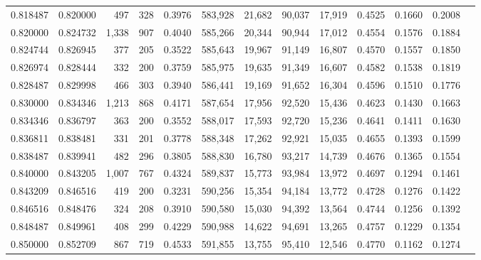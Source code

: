 \begin{tabular}{rrrrrrrrrrrrr}
0.818487 & 0.820000 &   497 & 328 &                                     0.3976 & 583,928 &  21,682 &  90,037 &  17,919 & 0.4525 & 0.1660 & 0.2008 \\
0.820000 & 0.824732 & 1,338 & 907 &                                     0.4040 & 585,266 &  20,344 &  90,944 &  17,012 & 0.4554 & 0.1576 & 0.1884 \\
0.824744 & 0.826945 &   377 & 205 &                                     0.3522 & 585,643 &  19,967 &  91,149 &  16,807 & 0.4570 & 0.1557 & 0.1850 \\
0.826974 & 0.828444 &   332 & 200 &                                     0.3759 & 585,975 &  19,635 &  91,349 &  16,607 & 0.4582 & 0.1538 & 0.1819 \\
0.828487 & 0.829998 &   466 & 303 &                                     0.3940 & 586,441 &  19,169 &  91,652 &  16,304 & 0.4596 & 0.1510 & 0.1776 \\
0.830000 & 0.834346 & 1,213 & 868 &                                     0.4171 & 587,654 &  17,956 &  92,520 &  15,436 & 0.4623 & 0.1430 & 0.1663 \\
0.834346 & 0.836797 &   363 & 200 &                                     0.3552 & 588,017 &  17,593 &  92,720 &  15,236 & 0.4641 & 0.1411 & 0.1630 \\
0.836811 & 0.838481 &   331 & 201 &                                     0.3778 & 588,348 &  17,262 &  92,921 &  15,035 & 0.4655 & 0.1393 & 0.1599 \\
0.838487 & 0.839941 &   482 & 296 &                                     0.3805 & 588,830 &  16,780 &  93,217 &  14,739 & 0.4676 & 0.1365 & 0.1554 \\
0.840000 & 0.843205 & 1,007 & 767 &                                     0.4324 & 589,837 &  15,773 &  93,984 &  13,972 & 0.4697 & 0.1294 & 0.1461 \\
0.843209 & 0.846516 &   419 & 200 &                                     0.3231 & 590,256 &  15,354 &  94,184 &  13,772 & 0.4728 & 0.1276 & 0.1422 \\
0.846516 & 0.848476 &   324 & 208 &                                     0.3910 & 590,580 &  15,030 &  94,392 &  13,564 & 0.4744 & 0.1256 & 0.1392 \\
0.848487 & 0.849961 &   408 & 299 &                                     0.4229 & 590,988 &  14,622 &  94,691 &  13,265 & 0.4757 & 0.1229 & 0.1354 \\
0.850000 & 0.852709 &   867 & 719 &                                     0.4533 & 591,855 &  13,755 &  95,410 &  12,546 & 0.4770 & 0.1162 & 0.1274 \\

\end{tabular}
